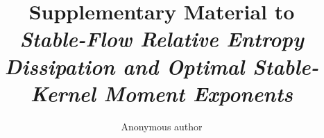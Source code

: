 \documentclass[11pt,reqno]{amsart}
\title[Supplementary Material]{Supplementary Material to\\
\emph{Stable-Flow Relative Entropy Dissipation and Optimal Stable-Kernel
Moment Exponents}}
\author{Anonymous author}
\date{}
\theoremstyle{plain}
\theoremstyle{definition}
\numberwithin{equation}{section}
\begin{document}
\def\JFAArticleSupplement{1}
\renewcommand{\thesection}{S\arabic{section}}
\maketitle





\end{document}
